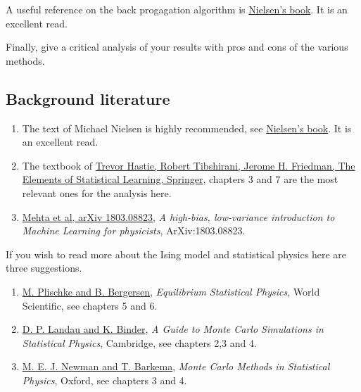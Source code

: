 \documentclass[%
oneside,                 %
final,                   %
10pt]{article}
\begin{document}
A useful reference on the back progagation algorithm is \href{{http://neuralnetworksanddeeplearning.com/}}{Nielsen's book}. It is an excellent read.


Finally, give a critical analysis of your results with pros and cons of the various methods. 




\subsection*{Background literature}

\begin{enumerate}
\item The text of Michael Nielsen is highly recommended, see \href{{http://neuralnetworksanddeeplearning.com/}}{Nielsen's book}. It is an excellent read.

\item The textbook of \href{{https://www.springer.com/gp/book/9780387848570}}{Trevor Hastie, Robert Tibshirani, Jerome H. Friedman, The Elements of Statistical Learning, Springer}, chapters 3 and 7 are the most relevant ones for the analysis here. 

\item \href{{https://arxiv.org/abs/1803.08823}}{Mehta et al, arXiv 1803.08823}, \emph{A high-bias, low-variance introduction to Machine Learning for physicists}, ArXiv:1803.08823.
\end{enumerate}

\noindent
If you wish to read more about the Ising model and statistical physics here are three suggestions.

\begin{enumerate}
\item \href{{http://www.worldscientific.com/worldscibooks/10.1142/5660}}{M. Plischke and B. Bergersen}, \emph{Equilibrium Statistical Physics}, World Scientific, see chapters 5 and 6.

\item \href{{http://www.cambridge.org/no/academic/subjects/physics/computational-science-and-modelling/guide-monte-carlo-simulations-statistical-physics-4th-edition?format=HB}}{D. P. Landau and K. Binder}, \emph{A Guide to Monte Carlo Simulations in Statistical Physics}, Cambridge, see chapters 2,3 and 4.

\item \href{{https://global.oup.com/academic/product/monte-carlo-methods-in-statistical-physics-9780198517979?cc=no&lang=en&}}{M. E. J. Newman and T. Barkema}, \emph{Monte Carlo Methods in Statistical Physics}, Oxford, see chapters 3 and 4.
\end{enumerate}

\noindent

\end{document}
